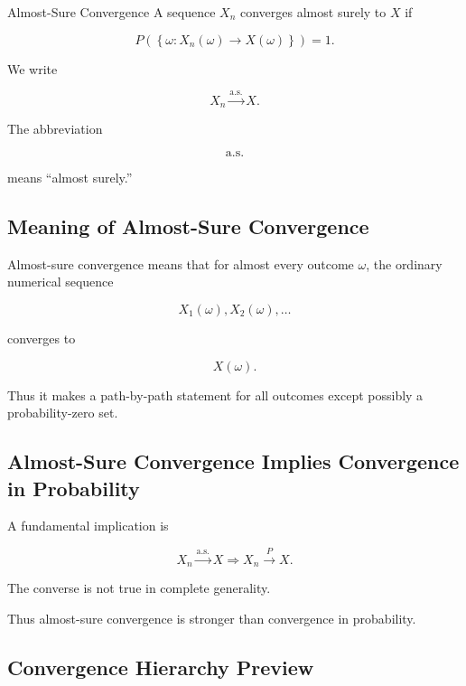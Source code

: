 \begin{definitionbox}{Almost-Sure Convergence}
A sequence \(X_n\) converges almost surely to \(X\) if

\[
\boxed{
P
\left(
\left\{
\omega:
X_n(\omega)\to X(\omega)
\right\}
\right)
=
1.
}
\]
\end{definitionbox}

We write

\[
\boxed{
X_n
\xrightarrow{\text{a.s.}}
X.
}
\]

The abbreviation

\[
\text{a.s.}
\]

means ``almost surely.''

\subsection{Meaning of Almost-Sure Convergence}
\label{subsec:meaning-almost-sure-convergence}

Almost-sure convergence means that for almost every outcome
\(\omega\), the ordinary numerical sequence

\[
X_1(\omega),
X_2(\omega),
\ldots
\]

converges to

\[
X(\omega).
\]

Thus it makes a path-by-path statement for all outcomes except possibly
a probability-zero set.

\subsection{Almost-Sure Convergence Implies Convergence in Probability}
\label{subsec:as-implies-probability}

A fundamental implication is

\[
\boxed{
X_n
\xrightarrow{\text{a.s.}}
X
\Longrightarrow
X_n
\xrightarrow{P}
X.
}
\]

The converse is not true in complete generality.

Thus almost-sure convergence is stronger than convergence in probability.

\subsection{Convergence Hierarchy Preview}
\label{subsec:convergence-hierarchy-preview}

